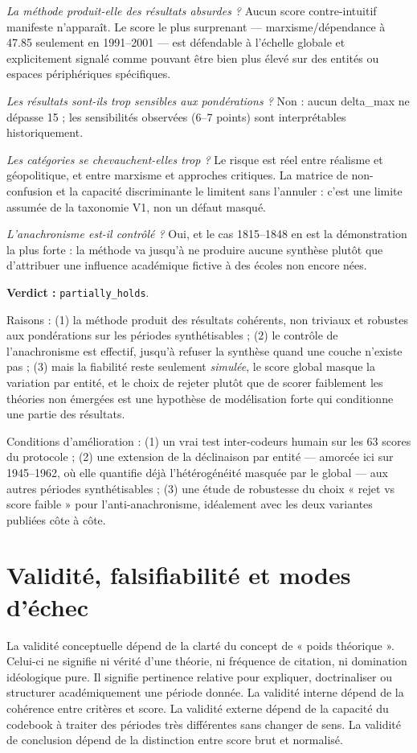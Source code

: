 \documentclass[11pt,a4paper]{article}
\begin{document}
\emph{La méthode produit-elle des résultats absurdes ?} Aucun score contre-intuitif manifeste n'apparaît. Le score le plus surprenant --- marxisme/dépendance à 47.85 seulement en 1991--2001 --- est défendable à l'échelle globale et explicitement signalé comme pouvant être bien plus élevé sur des entités ou espaces périphériques spécifiques.

\emph{Les résultats sont-ils trop sensibles aux pondérations ?} Non : aucun delta\_max ne dépasse 15 ; les sensibilités observées (6--7 points) sont interprétables historiquement.

\emph{Les catégories se chevauchent-elles trop ?} Le risque est réel entre réalisme et géopolitique, et entre marxisme et approches critiques. La matrice de non-confusion et la capacité discriminante le limitent sans l'annuler : c'est une limite assumée de la taxonomie V1, non un défaut masqué.

\emph{L'anachronisme est-il contrôlé ?} Oui, et le cas 1815--1848 en est la démonstration la plus forte : la méthode va jusqu'à ne produire aucune synthèse plutôt que d'attribuer une influence académique fictive à des écoles non encore nées.

\textbf{Verdict :} \texttt{partially\_holds}.

Raisons : (1) la méthode produit des résultats cohérents, non triviaux et robustes aux pondérations sur les périodes synthétisables ; (2) le contrôle de l'anachronisme est effectif, jusqu'à refuser la synthèse quand une couche n'existe pas ; (3) mais la fiabilité reste seulement \emph{simulée}, le score global masque la variation par entité, et le choix de rejeter plutôt que de scorer faiblement les théories non émergées est une hypothèse de modélisation forte qui conditionne une partie des résultats.

Conditions d'amélioration : (1) un vrai test inter-codeurs humain sur les 63 scores du protocole ; (2) une extension de la déclinaison par entité --- amorcée ici sur 1945--1962, où elle quantifie déjà l'hétérogénéité masquée par le global --- aux autres périodes synthétisables ; (3) une étude de robustesse du choix « rejet vs score faible » pour l'anti-anachronisme, idéalement avec les deux variantes publiées côte à côte.

\section{Validité, falsifiabilité et modes d'échec}

La validité conceptuelle dépend de la clarté du concept de « poids théorique ». Celui-ci ne signifie ni vérité d'une théorie, ni fréquence de citation, ni domination idéologique pure. Il signifie pertinence relative pour expliquer, doctrinaliser ou structurer académiquement une période donnée. La validité interne dépend de la cohérence entre critères et score. La validité externe dépend de la capacité du codebook à traiter des périodes très différentes sans changer de sens. La validité de conclusion dépend de la distinction entre score brut et normalisé.
\end{document}
